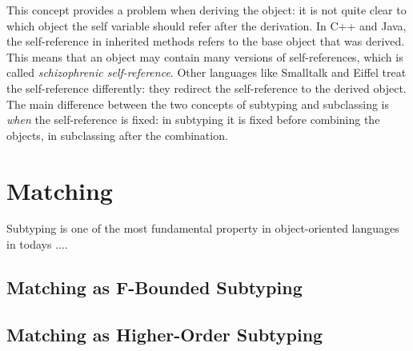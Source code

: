 This concept provides a problem when deriving the object: it is not
quite clear to which object the self variable should refer after the derivation.
In C++ and Java, the self-reference in inherited methods refers to the base
object that was derived. This means that an object may contain many versions
of self-references, which is called \emph{schizophrenic self-reference}. Other
languages like Smalltalk and Eiffel treat the self-reference differently: they
redirect the self-reference to the derived object. \\

The main difference between the two concepts of subtyping and subclassing is
\emph{when} the self-reference is fixed: in subtyping it is fixed before 
combining the objects, in subclassing after the combination.


\chapter{Matching}
Subtyping is one of the most fundamental property in object-oriented languages
in todays ....

\section{Matching as F-Bounded Subtyping}

\section{Matching as Higher-Order Subtyping}
